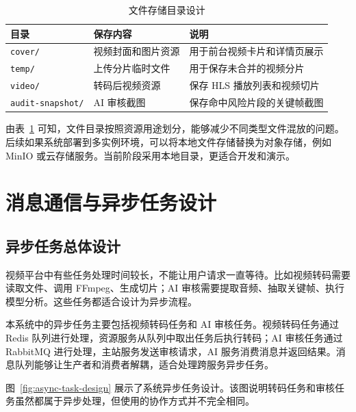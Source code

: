 \begin{table}[htbp]
  \centering
  \caption{文件存储目录设计}
  \label{tab:file-storage-design}
  \begin{tabular}{p{}p{}p{}}
    \hline
    \textbf{目录} & \textbf{保存内容} & \textbf{说明} \\
    \hline
    \texttt{cover/} & 视频封面和图片资源 & 用于前台视频卡片和详情页展示 \\
    \texttt{temp/} & 上传分片临时文件 & 用于保存未合并的视频分片 \\
    \texttt{video/} & 转码后视频资源 & 保存 HLS 播放列表和视频切片 \\
    \texttt{audit-snapshot/} & AI 审核截图 & 保存命中风险片段的关键帧截图 \\
    \hline
  \end{tabular}
\end{table}

由表~\ref{tab:file-storage-design} 可知，文件目录按照资源用途划分，能够减少不同类型文件混放的问题。后续如果系统部署到多实例环境，可以将本地文件存储替换为对象存储，例如 MinIO 或云存储服务。当前阶段采用本地目录，更适合开发和演示。

\section{消息通信与异步任务设计}
\label{sec:message-async-design}

\subsection{异步任务总体设计}
\label{subsec:async-task-overall-design}

视频平台中有些任务处理时间较长，不能让用户请求一直等待。比如视频转码需要读取文件、调用 FFmpeg、生成切片；AI 审核需要提取音频、抽取关键帧、执行模型分析。这些任务都适合设计为异步流程。

本系统中的异步任务主要包括视频转码任务和 AI 审核任务。视频转码任务通过 Redis 队列进行处理，资源服务从队列中取出任务后执行转码；AI 审核任务通过 RabbitMQ 进行处理，主站服务发送审核请求，AI 服务消费消息并返回结果。消息队列能够让生产者和消费者解耦，适合处理跨服务异步任务\cite{rabbitmqdocs}。

图~\ref{fig:async-task-design} 展示了系统异步任务设计。该图说明转码任务和审核任务虽然都属于异步处理，但使用的协作方式并不完全相同。


